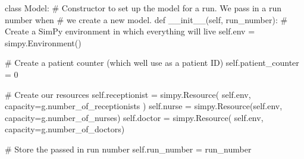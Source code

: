 \documentclass[
  letterpaper,
  DIV=11,
  numbers=noendperiod]{scrreprt}
\newenvironment{Shaded}{}{}
\newcommand{\CommentTok}[1]{\textcolor[rgb]{0.42,0.45,0.49}{#1}}
\newcommand{\DecValTok}[1]{\textcolor[rgb]{0.00,0.36,0.77}{#1}}
\newcommand{\FunctionTok}[1]{\textcolor[rgb]{0.44,0.26,0.76}{#1}}
\newcommand{\KeywordTok}[1]{\textcolor[rgb]{0.84,0.23,0.29}{#1}}
\newcommand{\NormalTok}[1]{\textcolor[rgb]{0.14,0.16,0.18}{#1}}
\newcommand{\OperatorTok}[1]{\textcolor[rgb]{0.14,0.16,0.18}{#1}}
\newcommand{\VariableTok}[1]{\textcolor[rgb]{0.89,0.38,0.04}{#1}}
\begin{document}
\label{annotated-cell-72}%
\begin{Shaded}
\begin{Highlighting}[]
\KeywordTok{class}\NormalTok{ Model:}
    \CommentTok{\# Constructor to set up the model for a run.  We pass in a run number when}
    \CommentTok{\# we create a new model.}
    \KeywordTok{def} \FunctionTok{\_\_init\_\_}\NormalTok{(}\VariableTok{self}\NormalTok{, run\_number):}
        \CommentTok{\# Create a SimPy environment in which everything will live}
        \VariableTok{self}\NormalTok{.env }\OperatorTok{=}\NormalTok{ simpy.Environment()}

        \CommentTok{\# Create a patient counter (which we\textquotesingle{}ll use as a patient ID)}
        \VariableTok{self}\NormalTok{.patient\_counter }\OperatorTok{=} \DecValTok{0}

        \CommentTok{\# Create our resources}
        \VariableTok{self}\NormalTok{.receptionist }\OperatorTok{=}\NormalTok{ simpy.Resource(}
            \VariableTok{self}\NormalTok{.env, capacity}\OperatorTok{=}\NormalTok{g.number\_of\_receptionists}
\NormalTok{        )}
        \VariableTok{self}\NormalTok{.nurse }\OperatorTok{=}\NormalTok{ simpy.Resource(}\VariableTok{self}\NormalTok{.env, capacity}\OperatorTok{=}\NormalTok{g.number\_of\_nurses)}
        \VariableTok{self}\NormalTok{.doctor }\OperatorTok{=}\NormalTok{ simpy.Resource(}
            \VariableTok{self}\NormalTok{.env, capacity}\OperatorTok{=}\NormalTok{g.number\_of\_doctors)}

        \CommentTok{\# Store the passed in run number}
        \VariableTok{self}\NormalTok{.run\_number }\OperatorTok{=}\NormalTok{ run\_number}


\end{Highlighting}
\end{Shaded}
\end{document}
